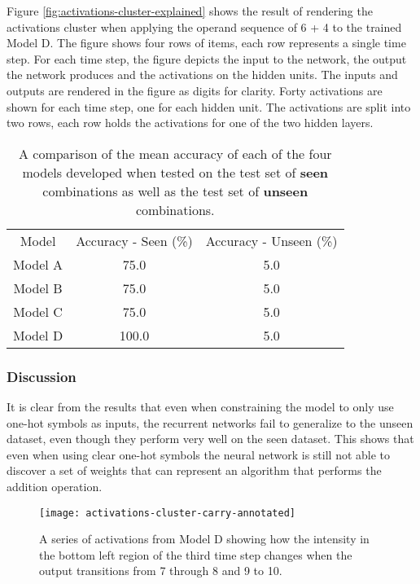 Figure \ref{fig:activations-cluster-explained} shows the result of rendering the activations cluster when applying the operand sequence of 6 + 4 to the trained Model D. The figure shows four rows of items, each row represents a single time step. For each time step, the figure depicts the input to the network, the output the network produces and the activations on the hidden units. The inputs and outputs are rendered in the figure as digits for clarity. Forty activations are shown for each time step, one for each hidden unit. The activations are split into two rows, each row holds the activations for one of the two hidden layers.

\begin{table}[h]
	\center
	\caption{A comparison of the mean accuracy of each of the four models developed when tested on the test set of \textbf{seen} combinations as well as the test set of \textbf{unseen} combinations.}
	\label{tab:experiment-6-results-table}
	\begin{tabular}{ |c|c|c| } 
		\hline
		Model & Accuracy - Seen (\%) & Accuracy - Unseen (\%)\\ 
		Model A & 75.0 & 5.0\\  
		Model B & 75.0 & 5.0\\  
		Model C & 75.0 & 5.0\\  
		Model D & 100.0 & 5.0\\
		\hline
	\end{tabular}
\end{table}

\subsubsection{Discussion}

It is clear from the results that even when constraining the model to only use one-hot symbols as inputs, the recurrent networks fail to generalize to the unseen dataset, even though they perform very well on the seen dataset. This shows that even when using clear one-hot symbols the neural network is still not able to discover a set of weights that can represent an algorithm that performs the addition operation.

\begin{figure}
	\centering
	\texttt{[image: activations-cluster-carry-annotated]}
	\caption{A series of activations from Model D showing how the intensity in the bottom left region of the third time step changes when the output transitions from 7 through 8 and 9 to 10.}%
	\label{fig:activations-cluster-carry}%
\end{figure}

